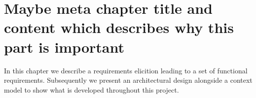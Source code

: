 \chapter{Maybe meta chapter title and content which describes why this part is important}
In this chapter we describe a requirements elicition leading to a set of functional requirements.
Subsequently we present an architectural design alongside a context model to show what is developed throughout this project.
